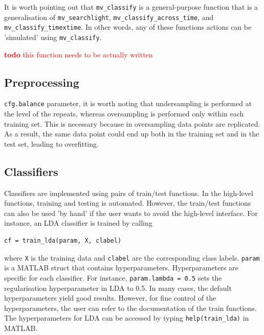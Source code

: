 \documentclass[utf8]{frontiersSCNS} %
\newcommand{\ttt}[1]{\texttt{#1}}
\newcommand{\todo}[1]{\textcolor{red}{\textbf{todo} #1}}
\begin{document}
It is worth pointing out that \texttt{mv\_classify} is a general-purpose function that is a generalisation of \texttt{mv\_searchlight}, \texttt{mv\_classify\_across\_time}, and \texttt{mv\_classify\_timextime}. In other words, any of these functions actions can be 'simulated' using \texttt{mv\_classify}.

\todo{this function needs to be actually written}


\subsection{Preprocessing}\label{sec:preprocessing}

\ttt{cfg.balance} parameter, it is worth noting that undersampling is performed at the level of the repeats, whereas oversampling is performed only within each training set. This is necessary because in oversampling data points are  replicated. As a result, the same data point could end up both in the training set and in the test set, leading to overfitting.


\subsection{Classifiers}\label{sec:classifiers}

Classifiers are implemented using pairs of train/test functions. In the high-level functions, training and testing is automated. However, the train/test functions can also be used 'by hand' if the user wants to avoid the high-level interface. For instance, an LDA classifier is trained by calling

\begin{verbatim}
cf = train_lda(param, X, clabel)
\end{verbatim}

where \ttt{X} is the training data and \ttt{clabel} are the corresponding class labels. \ttt{param} is a MATLAB struct that contains hyperparameters. Hyperparameters are specific for each classifier. For instance, \ttt{param.lambda = 0.5} sets the regularisation hyperparameter in LDA to 0.5. In many cases, the default hyperparameters yield good results. However, for fine control of the hyperparameters, the user can refer to the documentation of the train functions. The hyperparameters for LDA can be accessed by typing \ttt{help(train\_lda)} in MATLAB. 
\end{document}
